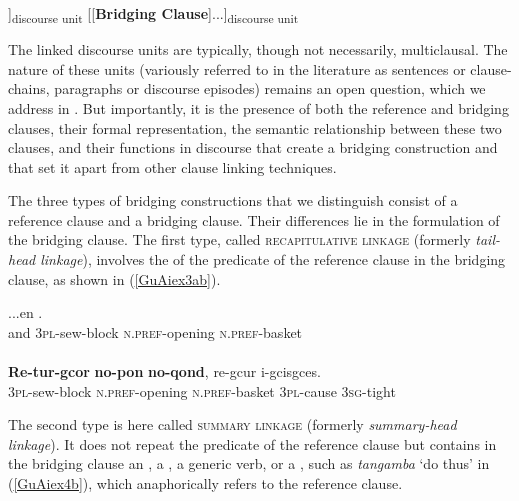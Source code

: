 \documentclass[output=paper]{LSP/langsci}
\begin{document}
\begin{exe}
\ex	\label{GuAiex2}
\glt  
[...[\underline{Reference Clause}]]\textsubscript{discourse unit} [[\textbf{Bridging Clause}]...]\textsubscript{discourse unit} \\
\end{exe}

The linked discourse units are typically, though not necessarily, multiclausal. The nature of these units (variously referred to in the literature as sentences or clause-chains, paragraphs or discourse episodes) remains an open question, which we address in . But importantly, it is the presence of both the reference and bridging clauses, their formal representation, the semantic relationship between these two clauses, and their functions in discourse that create a bridging construction and that set it apart from other clause linking techniques.

The three types of bridging constructions that we distinguish consist of a reference clause and a bridging clause. Their differences lie in the formulation of the bridging clause. The first type, called \textsc{recapitulative linkage} (formerly \textit{tail-head linkage}), involves the  of the predicate of the reference clause in the bridging clause, as shown in (\ref{GuAiex3ab}). 

\begin{exe}
	\ex	\label{GuAiex3ab}
\begin{xlist}
\ex	\label{GuAiex3a}
\gll		...en   \underline{}     \underline{}     \underline{}.\\
			and   \textsc{3pl}-sew-block   \textsc{n.pref}-opening   \textsc{n.pref}-basket\\
		\glt	{} \\
		\ex	\label{GuAiex3b}
\gll		\textbf{Re-tur-gcor }    \textbf{no-pon}     \textbf{no-qond},   re-gcur   i-gcisgces.\\
\textsc{3pl}-sew-block   \textsc{n.pref}-opening   \textsc{n.pref}-basket   \textsc{3pl}-cause   \textsc{3sg}-tight \\
		\glt	{} 
		\end{xlist}
\end{exe}


The second type is here called \textsc{summary linkage} (formerly \textit{summary-head linkage}). It does not repeat the predicate of the reference clause but contains in the bridging clause an , a , a generic verb, or a , such as \textit{tangamba} `do thus' in (\ref{GuAiex4b}), which anaphorically refers to the reference clause. 
\end{document}
